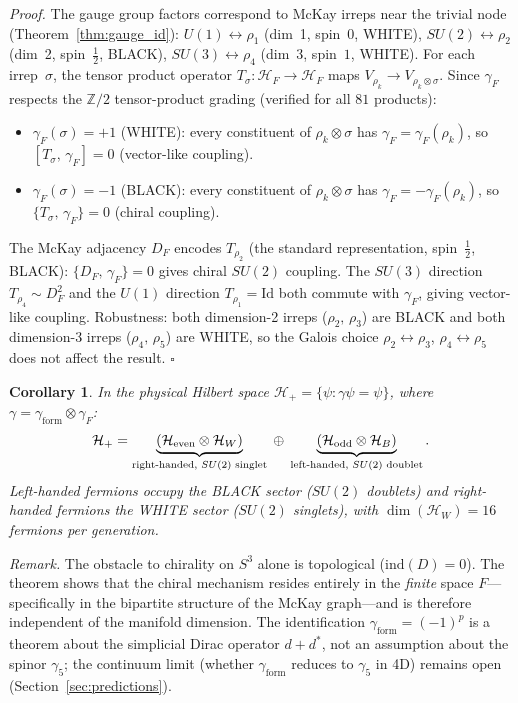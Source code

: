 \documentclass[12pt,a4paper]{article}
\newtheorem{corollary}{Corollary}
\theoremstyle{definition}
\begin{document}
\noindent\textit{Proof.}  The gauge group factors correspond to McKay irreps near the trivial node (Theorem~\ref{thm:gauge_id}): $U(1) \leftrightarrow \rho_1$ (dim~1, spin~$0$, WHITE), $SU(2) \leftrightarrow \rho_2$ (dim~2, spin~$\tfrac{1}{2}$, BLACK), $SU(3) \leftrightarrow \rho_4$ (dim~3, spin~$1$, WHITE).  For each irrep~$\sigma$, the tensor product operator $T_\sigma: \mathcal{H}_F \to \mathcal{H}_F$ maps $V_{\rho_k} \to V_{\rho_k \otimes \sigma}$.  Since $\gamma_F$ respects the $\mathbb{Z}/2$ tensor-product grading (verified for all $81$ products):
\begin{itemize}
\item $\gamma_F(\sigma) = +1$ (WHITE): every constituent of $\rho_k \otimes \sigma$ has $\gamma_F = \gamma_F(\rho_k)$, so $[T_\sigma,\, \gamma_F] = 0$ \textup{(vector-like coupling)}.
\item $\gamma_F(\sigma) = -1$ (BLACK): every constituent of $\rho_k \otimes \sigma$ has $\gamma_F = -\gamma_F(\rho_k)$, so $\{T_\sigma,\, \gamma_F\} = 0$ \textup{(chiral coupling)}.
\end{itemize}
The McKay adjacency $D_F$ encodes $T_{\rho_2}$ (the standard representation, spin~$\tfrac{1}{2}$, BLACK): $\{D_F,\, \gamma_F\} = 0$ gives chiral $SU(2)$ coupling.  The $SU(3)$ direction $T_{\rho_4} \sim D_F^2$ and the $U(1)$ direction $T_{\rho_1} = \mathrm{Id}$ both commute with $\gamma_F$, giving vector-like coupling.  Robustness: both dimension-2 irreps ($\rho_2,\, \rho_3$) are BLACK and both dimension-3 irreps ($\rho_4,\, \rho_5$) are WHITE, so the Galois choice $\rho_2 \leftrightarrow \rho_3$, $\rho_4 \leftrightarrow \rho_5$ does not affect the result.  \hfill$\square$

\begin{corollary}\label{cor:left_handed}
In the physical Hilbert space $\mathcal{H}_+ = \{\psi : \gamma\psi = \psi\}$, where $\gamma = \gamma_{\mathrm{form}} \otimes \gamma_F$:
\[
\mathcal{H}_+ = \underbrace{(\mathcal{H}_{\mathrm{even}} \otimes \mathcal{H}_W)}_{\textup{right-handed, $SU(2)$ singlet}} \;\oplus\; \underbrace{(\mathcal{H}_{\mathrm{odd}} \otimes \mathcal{H}_B)}_{\textup{left-handed, $SU(2)$ doublet}}.
\]
Left-handed fermions occupy the BLACK sector ($SU(2)$ doublets) and right-handed fermions the WHITE sector ($SU(2)$ singlets), with $\dim(\mathcal{H}_W) = 16$ fermions per generation.
\end{corollary}

\noindent\textit{Remark.}  The obstacle to chirality on $S^3$ alone is topological ($\mathrm{ind}(D) = 0$).  The theorem shows that the chiral mechanism resides entirely in the \emph{finite} space $F$---specifically in the bipartite structure of the McKay graph---and is therefore independent of the manifold dimension.  The identification $\gamma_{\mathrm{form}} = (-1)^p$ is a theorem about the simplicial Dirac operator $d + d^*$, not an assumption about the spinor $\gamma_5$; the continuum limit (whether $\gamma_{\mathrm{form}}$ reduces to $\gamma_5$ in 4D) remains open (Section~\ref{sec:predictions}).
\end{document}
